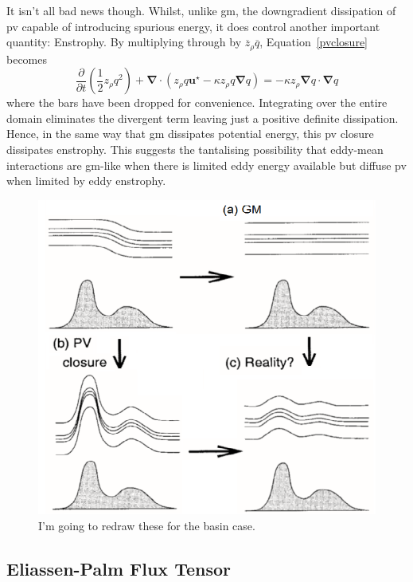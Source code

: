 \documentclass[10pt,a4paper]{report}
\newcommand*\mean[1]{\overline{#1}}
\newcommand*\equref[1]{Equation~\eqref{#1}}
\newcommand*{\half}{\frac{1}{2}}
\begin{document}
                It isn't all bad news though. Whilst, unlike \gls{gm}, the downgradient
                dissipation of \gls{pv} capable of introducing spurious energy, it does
                control another important quantity: Enstrophy. By multiplying through 
                by $\mean{z}_{\rho} \mean{q}$, \equref{pvclosure} becomes 
                \begin{equation}
                \frac{\partial  }{\partial t}\left(\half z_{\rho}q^{2}\right) + \boldsymbol{\nabla}\cdot\left(z_{\rho}q\boldsymbol{u}^\star-\kappa z_{\rho}q\boldsymbol{\nabla} q
                \right)=-\kappa z_\rho \boldsymbol{\nabla}q\cdot\boldsymbol{\nabla}q
                \end{equation}
                where the bars have been dropped for convenience.
                Integrating over the entire domain eliminates the divergent term
                leaving just a positive definite dissipation.
                Hence, in the same way that \gls{gm} dissipates potential energy, this
                \gls{pv} closure dissipates enstrophy. This suggests the tantalising
                possibility that eddy-mean interactions are \gls{gm}-like when
                there is limited eddy energy available but diffuse \gls{pv} when
                limited by eddy enstrophy.
                
                \begin{figure}
                	\centering
                	\includegraphics[width=0.6\linewidth]{am00}
                	\caption[Cold-doming]{I'm going to redraw these for the basin case.}
                	\label{fig:Colddoming}
                \end{figure}
                
                
                
                \subsection{Eliassen-Palm Flux Tensor}
                
\end{document}
